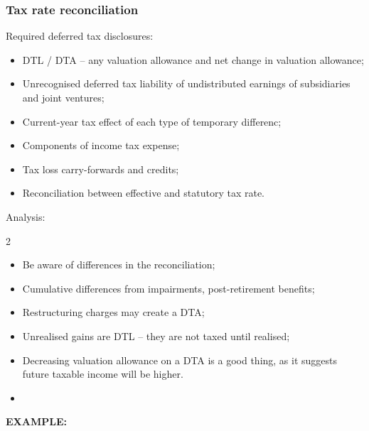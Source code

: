\documentclass[../notes_compiled.tex]{subfiles}
\begin{document}
\subsubsection{Tax rate reconciliation}
\begin{itemize}
\item Required deferred tax disclosures:
\begin{itemize}
\item DTL / DTA -- any valuation allowance and net change in valuation allowance;
\item Unrecognised deferred tax liability of undistributed earnings of subsidiaries and joint ventures;
\item Current-year tax effect of each type of temporary differenc;
\item Components of income tax expense;
\item Tax loss carry-forwards and credits;
\item Reconciliation between effective and statutory tax rate.
\end{itemize}

\item Analysis:
\begin{multicols}{2}
\begin{itemize}
\item Be aware of differences in the reconciliation;
\item Cumulative differences from impairments, post-retirement benefits;
\item Restructuring charges may create a DTA;
\item Unrealised gains are DTL -- they are not taxed until realised;
\item Decreasing valuation allowance on a DTA is a good thing, as it suggests future taxable income will be higher.
\item[]
\end{itemize}
\end{multicols}

{\color{RedViolet}
\item[] \textbf{EXAMPLE:}


}
\end{itemize}
\end{document}
